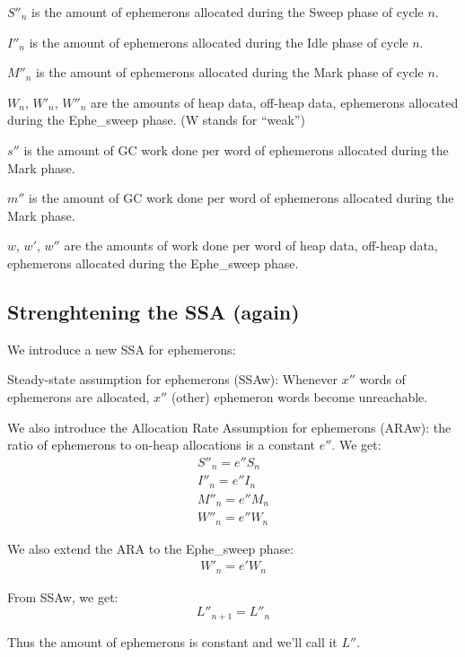 \documentclass{article}
\begin{document}
$S''_n$ is the amount of ephemerons allocated during the Sweep phase
of cycle $n$.

$I''_n$ is the amount of ephemerons allocated during the Idle phase
of cycle $n$.

$M''_n$ is the amount of ephemerons allocated during the Mark phase
of cycle $n$.

$W_n$, $W'_n$, $W''_n$ are the amounts of heap data, off-heap
data, ephemerons allocated during the Ephe\_sweep phase. (W stands for
``weak'')

$s''$ is the amount of GC work done per word of ephemerons allocated
during the Mark phase.

$m''$ is the amount of GC work done per word of ephemerons allocated
during the Mark phase.

$w$, $w'$, $w''$ are the amounts of work done per word of
heap data, off-heap data, ephemerons allocated during the Ephe\_sweep
phase.


\subsection{Strenghtening the SSA (again)}

We introduce a new SSA for ephemerons:

Steady-state assumption for ephemerons (SSAw): Whenever $x''$
words of ephemerons are allocated, $x''$ (other) ephemeron words
become unreachable.

We also introduce the Allocation Rate Assumption for ephemerons
(ARAw): the ratio of ephemerons to on-heap allocations is a constant
$e''$. We get:
\begin{gather}
S''_n = e''S_n \label{eqn-S''} \\
I''_n = e''I_n \label{eqn-I''} \\
M''_n = e''M_n \label{eqn-M''} \\
W''_n = e''W_n \label{eqn-W''}
\end{gather}

We also extend the ARA to the Ephe\_sweep phase:
\begin{gather}
W'_n = e'W_n  \label{eqn-W'}
\end{gather}

From SSAw, we get:
\begin{equation}
L''_{n+1} = L''_n
\end{equation}

Thus the amount of ephemerons is constant and we'll call it $L''$.
\end{document}

